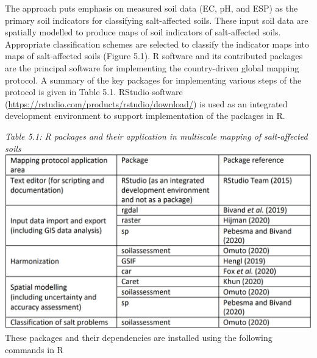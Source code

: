 \documentclass[
  10pt,
  b5paper,
]{book}
\begin{document}
The approach puts emphasis on measured soil data (EC, pH, and ESP) as the primary soil indicators for classifying salt-affected soils. These input soil data are spatially modelled to produce maps of soil indicators of salt-affected soils. Appropriate classification schemes are selected to classify the indicator maps into maps of salt-affected soils (Figure 5.1).
R software and its contributed packages are the principal software for implementing the country-driven global mapping protocol. A summary of the key packages for implementing various steps of the protocol is given in Table 5.1. RStudio software (\url{https://rstudio.com/products/rstudio/download/}) is used as an integrated development environment to support implementation of the packages in R.

\emph{Table 5.1: R packages and their application in multiscale mapping of salt-affected soils}
\includegraphics{figures/tables/Table_5.1.png}
These packages and their dependencies are installed using the following commands in R
\end{document}
